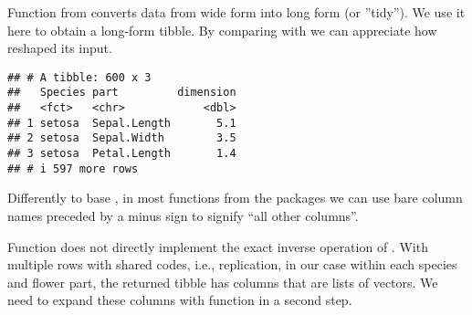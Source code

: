 \documentclass[krantz2]{krantz}\usepackage{knitr}
\begin{document}
Function  from  converts data from wide form into long form (or ''tidy''). We use it here to obtain a long-form tibble. By comparing  with  we can appreciate how  reshaped its input.

\begin{knitrout}\footnotesize
{}\color{fgcolor}\begin{kframe}
\begin{alltt}
 \hlkwb{<-}
                \hlstd{=} \hlopt{-}
                \hlstd{=} \hlstd{,}
                \hlstd{=} \hlstd{)}
\end{alltt}
\begin{verbatim}
## # A tibble: 600 x 3
##   Species part         dimension
##   <fct>   <chr>            <dbl>
## 1 setosa  Sepal.Length       5.1
## 2 setosa  Sepal.Width        3.5
## 3 setosa  Petal.Length       1.4
## # i 597 more rows
\end{verbatim}
\end{kframe}
\end{knitrout}

\begin{infobox}
  Differently to base \Rlang, in most functions from the  packages we can use bare column names preceded by a minus sign to signify ``all other columns''.
\end{infobox}

Function  does not directly implement the exact inverse operation of . With multiple rows with shared codes, i.e., replication, in our case within each species and flower part, the returned tibble has columns that are lists of vectors. We need to expand these columns with function  in a second step.
\end{document}
